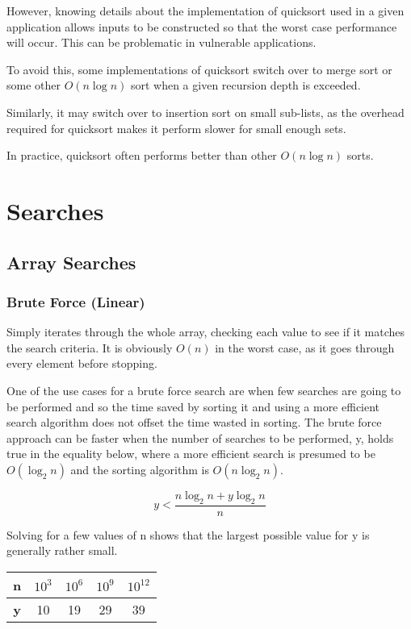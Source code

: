 \documentclass[]{article}
\begin{document}
However, knowing details about the implementation of quicksort used in a given application allows inputs to be constructed so that the worst case performance will occur. This can be problematic in vulnerable applications.

To avoid this, some implementations of quicksort switch over to merge sort or some other $O(n\log{n})$ sort when a given recursion depth is exceeded.

Similarly, it may switch over to insertion sort on small sub-lists, as the overhead required for quicksort makes it perform slower for small enough sets.

In practice, quicksort often performs better than other $O(n\log{n})$ sorts.

\pagebreak

\section{Searches}

\subsection{Array Searches}

\subsubsection{Brute Force (Linear)}

Simply iterates through the whole array, checking each value to see if it matches the search criteria. It is obviously $O(n)$ in the worst case, as it goes through every element before stopping.

One of the use cases for a brute force search are when few searches are going to be performed and so the time saved by sorting it and using a more efficient search algorithm does not offset the time wasted in sorting. The brute force approach can be faster when the number of searches to be performed, y, holds true in the equality below, where a more efficient search is presumed to be $O(\log_{2}{n})$ and the sorting algorithm is $O(n\log_{2}{n})$.

\[y < \frac{n\log_{2}{n} + y\log_{2}{n}}{n}\]

Solving for a few values of n shows that the largest possible value for y is generally rather small.

\begin{table}[h]
	\centering
\begin{tabular}{|c|c|c|c|c|}
	\hline \textbf {n} & $10^3$ & $10^6$ & $10^9$ & $10^{12}$ \\
	\hline \textbf{y} & 10 & 19 & 29 & 39 \\
	\hline 
\end{tabular}
\end{table}
\end{document}
